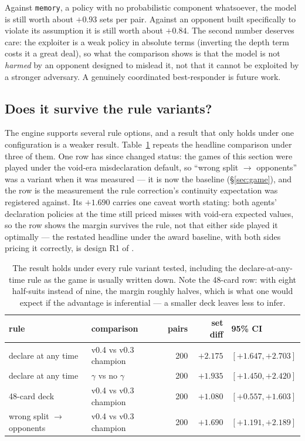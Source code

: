 \documentclass[11pt,a4paper]{article}
\begin{document}
Against \texttt{memory}, a policy with no probabilistic component whatsoever,
the model is still worth about $+0.93$ sets per pair. Against an opponent built
specifically to violate its assumption it is still worth about $+0.84$. The
second number deserves care: the exploiter is a weak policy in absolute terms
(inverting the depth term costs it a great deal), so what the comparison shows
is that the model is not \emph{harmed} by an opponent designed to mislead it,
not that it cannot be exploited by a stronger adversary. A genuinely coordinated
best-responder is future work.

\subsection{Does it survive the rule variants?}
\label{sec:res-rules}

The engine supports several rule options, and a result that only holds under one
configuration is a weaker result. Table~\ref{tab:rules} repeats the headline
comparison under three of them. One row has since changed status: the games
of this section were played under the void-era misdeclaration default, so
``wrong split $\to$ opponents'' was a variant when it was measured --- it is
now the baseline (\S\ref{sec:game}), and the row is the measurement the rule
correction's continuity expectation was registered against. Its $+1.690$
carries one caveat worth stating: both agents' declaration policies at the
time still priced misses with void-era expected values, so the row shows the
margin survives the rule, not that either side played it optimally --- the
restated headline under the award baseline, with both sides pricing it
correctly, is design R1 of .

\begin{table}[t]
\centering
\small
\begin{tabular}{llrrl}
\toprule
rule & comparison & pairs & set diff & 95\% CI \\
\midrule
declare at any time & v0.4 vs v0.3 champion & 200 & $+2.175$ & $[+1.647, +2.703]$ \\
declare at any time & $\gamma$ vs no $\gamma$ & 200 & $+1.935$ & $[+1.450, +2.420]$ \\
48-card deck & v0.4 vs v0.3 champion & 200 & $+1.080$ & $[+0.557, +1.603]$ \\
wrong split $\to$ opponents & v0.4 vs v0.3 champion & 200 & $+1.690$ & $[+1.191, +2.189]$ \\
\bottomrule
\end{tabular}
\caption{The result holds under every rule variant tested, including the
declare-at-any-time rule as the game is usually written down. Note the 48-card
row: with eight half-suits instead of nine, the margin roughly halves, which is
what one would expect if the advantage is inferential --- a smaller deck leaves
less to infer.}
\label{tab:rules}
\end{table}
\end{document}
